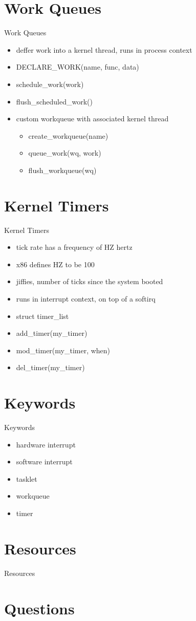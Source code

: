 \documentclass{workshop}
\begin{document}
\section{Work Queues}
\begin{frame}{Work Queues}
\begin{itemize}
\item deffer work into a kernel thread, runs in process context
\item DECLARE_WORK(name, func, data)
\item schedule_work(work)
\item flush_scheduled_work()
\item custom workqueue with associated kernel thread
\begin{itemize}
\item create_workqueue(name)
\item queue_work(wq, work)
\item flush_workqueue(wq)
\end{itemize}
\end{itemize}
\end{frame}


\section{Kernel Timers}
\begin{frame}{Kernel Timers}
\begin{itemize}
\item tick rate has a frequency of HZ hertz
\item x86 defines HZ to be 100
\item jiffies, number of ticks since the system booted
\item runs in interrupt context, on top of a softirq
\item struct timer_list 
\item add_timer(my_timer)
\item mod_timer(my_timer, when)
\item del_timer(my_timer)
\end{itemize}
\end{frame}


\section{Keywords}
\begin{frame}{Keywords}
\begin{itemize}
\item hardware interrupt
\item software interrupt
\item tasklet
\item workqueue
\item timer
\end{itemize}
\end{frame}

\section{Resources}
\begin{frame}{Resources}
\end{frame}

\section{Questions}
\end{document}
